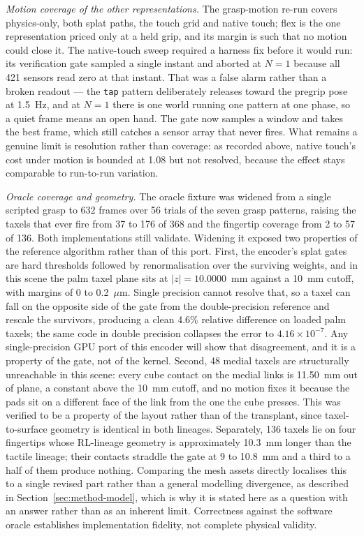 \documentclass[journal]{IEEEtran}
\begin{document}
\textit{Motion coverage of the other representations.} The grasp-motion re-run covers physics-only, both splat paths, the touch grid and native touch; flex is the one representation priced only at a held grip, and its margin is such that no motion could close it. The native-touch sweep required a harness fix before it would run: its verification gate sampled a single instant and aborted at $N=1$ because all 421 sensors read zero at that instant. That was a false alarm rather than a broken readout --- the \texttt{tap} pattern deliberately releases toward the pregrip pose at 1.5~Hz, and at $N=1$ there is one world running one pattern at one phase, so a quiet frame means an open hand. The gate now samples a window and takes the best frame, which still catches a sensor array that never fires. What remains a genuine limit is resolution rather than coverage: as recorded above, native touch's cost under motion is bounded at 1.08 but not resolved, because the effect stays comparable to run-to-run variation.

\textit{Oracle coverage and geometry.} The oracle fixture was widened from a single scripted grasp to 632 frames over 56 trials of the seven grasp patterns, raising the taxels that ever fire from 37 to 176 of 368 and the fingertip coverage from 2 to 57 of 136. Both implementations still validate. Widening it exposed two properties of the reference algorithm rather than of this port. First, the encoder's splat gates are hard thresholds followed by renormalisation over the surviving weights, and in this scene the palm taxel plane sits at $|z|=10.0000$~mm against a 10~mm cutoff, with margins of 0 to 0.2~$\mu$m. Single precision cannot resolve that, so a taxel can fall on the opposite side of the gate from the double-precision reference and rescale the survivors, producing a clean 4.6\% relative difference on loaded palm taxels; the same code in double precision collapses the error to $4.16\times10^{-7}$. Any single-precision GPU port of this encoder will show that disagreement, and it is a property of the gate, not of the kernel. Second, 48 medial taxels are structurally unreachable in this scene: every cube contact on the medial links is 11.50~mm out of plane, a constant above the 10~mm cutoff, and no motion fixes it because the pads sit on a different face of the link from the one the cube presses. This was verified to be a property of the layout rather than of the transplant, since taxel-to-surface geometry is identical in both lineages. Separately, 136 taxels lie on four fingertips whose RL-lineage geometry is approximately 10.3~mm longer than the tactile lineage; their contacts straddle the gate at 9 to 10.8~mm and a third to a half of them produce nothing. Comparing the mesh assets directly localises this to a single revised part rather than a general modelling divergence, as described in Section~\ref{sec:method-model}, which is why it is stated here as a question with an answer rather than as an inherent limit. Correctness against the software oracle establishes implementation fidelity, not complete physical validity.
\end{document}
